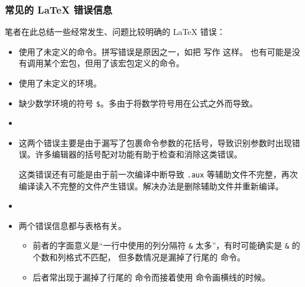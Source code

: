 \subsubsection{常见的 \LaTeX{} 错误信息}

笔者在此总结一些经常发生、问题比较明确的 \LaTeX{} 错误：

\long{}

\begin{itemize}
\item {}

使用了未定义的命令。拼写错误是原因之一，如把  写作  这样。
也有可能是没有调用某个宏包，但用了该宏包定义的命令。

\item {}

使用了未定义的环境。

\item {}

缺少数学环境的符号 \texttt\$。多由于将数学符号用在公式之外而导致。

\item {}

\item {}

这两个错误主要是由于漏写了包裹命令参数的花括号，导致识别参数时出现错误。许多编辑器的括号配对功能有助于检查和消除这类错误。

这类错误还有可能是由于前一次编译中断导致 \texttt{.aux} 等辅助文件不完整，再次编译读入不完整的文件产生错误。解决办法是删除辅助文件并重新编译。

\item {}

\item {}

两个错误信息都与表格有关。
\begin{itemize}
  \item 前者的字面意义是“一行中使用的列分隔符 \texttt\& 太多”，有时可能确实是 \texttt\& 的个数和列格式不匹配，
  但多数情况是漏掉了行尾的 \crcmd{} 命令。
  \item 后者常出现于漏掉了行尾的 \crcmd{} 命令而接着使用  命令画横线的时候。
\end{itemize}


\end{itemize}
